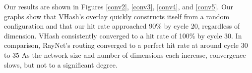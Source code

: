 \documentclass[10pt, conference, letterpaper]{IEEEtran}
\begin{document}
Our results are shown in Figures \ref{conv2}, \ref{conv3}, \ref{conv4}, and \ref{conv5}.
Our graphs show that VHash's overlay quickly constructs itself from a random configuration and that our hit rate approached 90\% by cycle 20, regardless of dimension.
VHash consistently converged to a hit rate of 100\% by cycle 30. 
In comparison, RayNet's routing converged to a perfect hit rate at around cycle 30 to 35 \cite{raynet} 
As the network size and number of dimensions each increase, convergence slows, but not to a significant degree.
 
\end{document}
